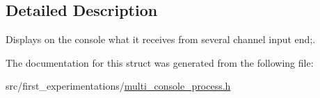 \subsection{Detailed Description}
Displays on the console what it receives from several channel input end;. 

The documentation for this struct was generated from the following file\-:\begin{DoxyCompactItemize}
\item 
src/first\-\_\-experimentations/\hyperlink{multi__console__process_8h}{multi\-\_\-console\-\_\-process.\-h}\end{DoxyCompactItemize}
